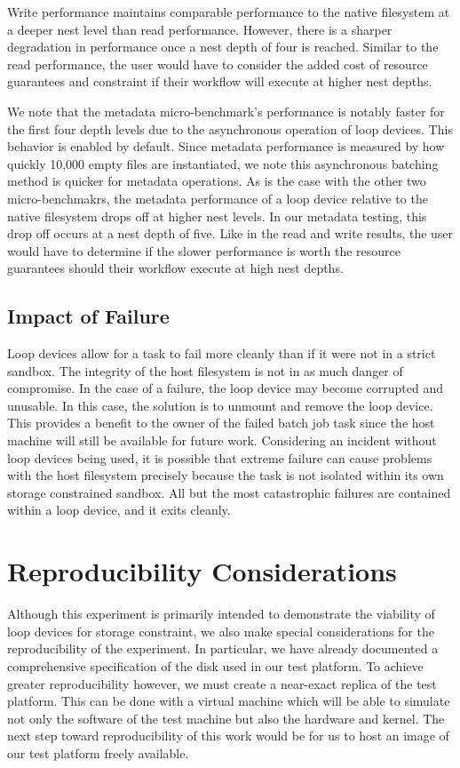 \documentclass[conference]{IEEEtran}
\begin{document}
Write performance maintains comparable performance to the native filesystem at a deeper nest level than read performance. However, there is a sharper degradation in performance once a nest depth of four is reached. Similar to the read performance, the user would have to consider the added cost of resource guarantees and constraint if their workflow will execute at higher nest depths. 

We note that the metadata micro-benchmark's performance is notably faster for the first four depth levels due to the asynchronous operation of loop devices. This behavior is enabled by default. Since metadata performance is measured by how quickly 10,000 empty files are instantiated, we note this asynchronous batching method is quicker for metadata operations. As is the case with the other two micro-benchmakrs, the metadata performance of a loop device relative to the native filesystem drops off at higher nest levels. In our metadata testing, this drop off occurs at a nest depth of five. Like in the read and write results, the user would have to determine if the slower performance is worth the resource guarantees should their workflow execute at high nest depths.

\subsection{Impact of Failure}
Loop devices allow for a task to fail more cleanly than if it were not in a strict sandbox. The integrity of the host filesystem is not in as much danger of compromise. In the case of a failure, the loop device may become corrupted and unusable. In this case, the solution is to unmount and remove the loop device. This provides a benefit to the owner of the failed batch job task since the host machine will still be available for future work. Considering an incident without loop devices being used, it is possible that extreme failure can cause problems with the host filesystem precisely because the task is not isolated within its own storage constrained sandbox. All but the most catastrophic failures are contained within a loop device, and it exits cleanly.

\section{Reproducibility Considerations}
Although this experiment is primarily intended to demonstrate the viability of loop devices for storage constraint, we also make special considerations for the reproducibility of the experiment. In particular, we have already documented a comprehensive specification of the disk used in our test platform. To achieve greater reproducibility however, we must create a near-exact replica of the test platform. This can be done with a virtual machine which will be able to simulate not only the software of the test machine but also the hardware and kernel. The next step toward reproducibility of this work would be for us to host an image of our test platform freely available.
\end{document}
